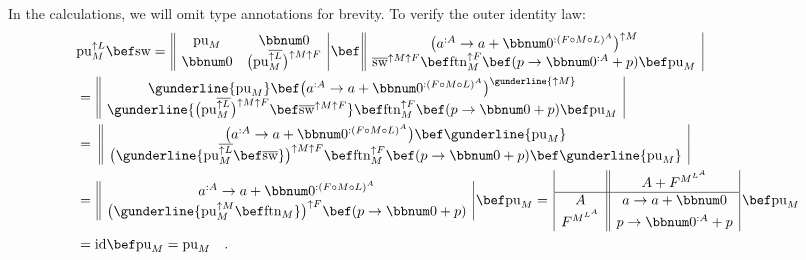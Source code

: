 In the calculations, we will omit type annotations for brevity. To
verify the outer identity law:
\begin{align*}
 & \text{pu}_{M}^{\uparrow L}\bef\text{sw}=\,\begin{array}{||cc|}
\text{pu}_{M} & \bbnum 0\\
\bbnum 0 & \big(\text{pu}_{M}^{\overline{\uparrow L}}\big)^{\uparrow M\uparrow F}
\end{array}\,\bef\,\begin{array}{||c|}
\big(a^{:A}\rightarrow a+\bbnum 0^{:(F\circ M\circ L)^{A}}\big)^{\uparrow M}\\
\overline{\text{sw}}^{\uparrow M\uparrow F}\bef\text{ftn}_{M}^{\uparrow F}\bef(p\rightarrow\bbnum 0^{:A}+p)\bef\text{pu}_{M}
\end{array}\\
 & =\,\begin{array}{||c|}
\gunderline{\text{pu}_{M}}\bef\big(a^{:A}\rightarrow a+\bbnum 0^{:(F\circ M\circ L)^{A}}\big)^{\gunderline{\uparrow M}}\\
\gunderline{\big(\text{pu}_{M}^{\overline{\uparrow L}}\big)^{\uparrow M\uparrow F}\bef\overline{\text{sw}}^{\uparrow M\uparrow F}}\bef\text{ftn}_{M}^{\uparrow F}\bef(p\rightarrow\bbnum 0+p)\bef\text{pu}_{M}
\end{array}\\
 & =\,\,\begin{array}{||c|}
\big(a^{:A}\rightarrow a+\bbnum 0^{:(F\circ M\circ L)^{A}}\big)\bef\gunderline{\text{pu}_{M}}\\
\big(\gunderline{\text{pu}_{M}^{\overline{\uparrow L}}\bef\overline{\text{sw}}}\big)^{\uparrow M\uparrow F}\bef\text{ftn}_{M}^{\uparrow F}\bef(p\rightarrow\bbnum 0+p)\bef\gunderline{\text{pu}_{M}}
\end{array}\\
 & =\,\begin{array}{||c|}
a^{:A}\rightarrow a+\bbnum 0^{:(F\circ M\circ L)^{A}}\\
\big(\gunderline{\text{pu}_{M}^{\uparrow M}\bef\text{ftn}_{M}}\big)^{\uparrow F}\bef(p\rightarrow\bbnum 0+p)
\end{array}\,\bef\text{pu}_{M}=\,\begin{array}{|c||c|}
 & A+F^{M^{L^{A}}}\\
\hline A & a\rightarrow a+\bbnum 0\\
F^{M^{L^{A}}} & p\rightarrow\bbnum 0^{:A}+p
\end{array}\,\bef\text{pu}_{M}\\
 & =\text{id}\bef\text{pu}_{M}=\text{pu}_{M}\quad.
\end{align*}

